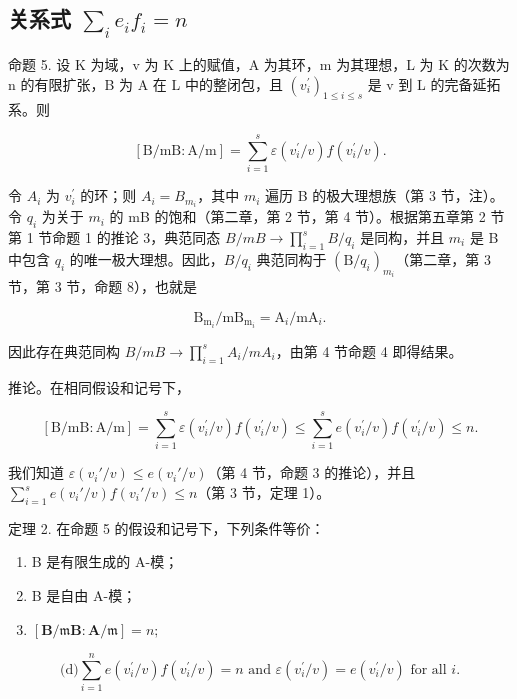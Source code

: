 \subsection{\texorpdfstring{关系式 \(\sum_{i} e_{i} f_{i} = n\)}{关系式 Σ ei fi = n}}

命题 5. 设 K 为域，v 为 K 上的赋值，A 为其环，m 为其理想，L 为 K 的次数为 n 的有限扩张，B 为 A 在 L 中的整闭包，且 \((v_{i}^{\prime})_{1 \leq i \leq s}\) 是 v 到 L 的完备延拓系。则

\[
[ \mathrm{B} / \mathrm{mB}: \mathrm{A} / \mathrm{m} ] = \sum_ {i = 1} ^ {s} \varepsilon (v _ {i} ^ {\prime} / v) f (v _ {i} ^ {\prime} / v).
\]

令 \(A_{i}\) 为 \(v_{i}^{\prime}\) 的环；则 \(A_{i} = B_{m_{i}}\)，其中 \(m_{i}\) 遍历 B 的极大理想族（第 3 节，注）。令 \(q_{i}\) 为关于 \(m_{i}\) 的 mB 的饱和（第二章，第 2 节，第 4 节）。根据第五章第 2 节第 1 节命题 1 的推论 3，典范同态 \(B/mB \rightarrow \prod_{i=1}^{s} B/q_i\) 是同构，并且 \(m_i\) 是 B 中包含 \(q_i\) 的唯一极大理想。因此，\(B/q_i\) 典范同构于 \((\mathrm{B}/q_i)_{m_i}\)（第二章，第 3 节，第 3 节，命题 8），也就是

\[
\mathrm{B} _ {\mathrm{m} _ {i}} / \mathrm{mB} _ {\mathrm{m} _ {i}} = \mathrm{A} _ {i} / \mathrm{mA} _ {i}.
\]

因此存在典范同构 \(B/mB \rightarrow \prod_{i=1}^{s} A_{i}/mA_{i}\)，由第 4 节命题 4 即得结果。

推论。在相同假设和记号下，

\[
[ \mathrm{B} / \mathrm{mB}: \mathrm{A} / \mathrm{m} ] = \sum_ {i = 1} ^ {s} \varepsilon (v _ {i} ^ {\prime} / v) f (v _ {i} ^ {\prime} / v) \leqslant \sum_ {i = 1} ^ {s} e (v _ {i} ^ {\prime} / v) f (v _ {i} ^ {\prime} / v) \leqslant n.
\]

我们知道 \(\varepsilon(v_i'/v) \leqslant e(v_i'/v)\)（第 4 节，命题 3 的推论），并且 \(\sum_{i=1}^{s} e(v_i'/v)f(v_i'/v) \leqslant n\)（第 3 节，定理 1）。

定理 2. 在命题 5 的假设和记号下，下列条件等价：

\begin{enumerate}
\def\labelenumi{(\alph{enumi})}
\item
  B 是有限生成的 A-模；
\item
  B 是自由 A-模；
\item
  \([\mathbf{B} / \mathfrak{m}\mathbf{B}\colon \mathbf{A} / \mathfrak{m}] = n;\)
\end{enumerate}

\[
\text {(d)} \sum_ {i = 1} ^ {n} e (v _ {i} ^ {\prime} / v) f (v _ {i} ^ {\prime} / v) = n \text { and } \varepsilon (v _ {i} ^ {\prime} / v) = e (v _ {i} ^ {\prime} / v) \text { for   all } i.
\]

